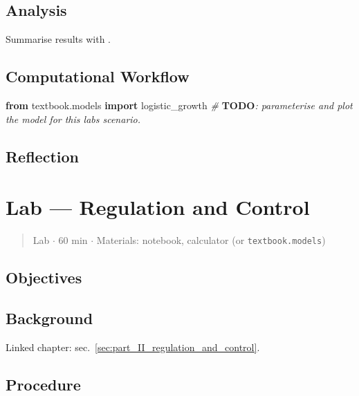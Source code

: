 \documentclass[
]{article}
\newenvironment{Shaded}{}{}
\newcommand{\AlertTok}[1]{\textcolor[rgb]{1.00,0.00,0.00}{\textbf{#1}}}
\newcommand{\CommentTok}[1]{\textcolor[rgb]{0.38,0.63,0.69}{\textit{#1}}}
\newcommand{\ImportTok}[1]{\textcolor[rgb]{0.00,0.50,0.00}{\textbf{#1}}}
\newcommand{\NormalTok}[1]{#1}
\theoremstyle{plain}
\theoremstyle{definition}
\begin{document}
\subsection{Analysis}\label{analysis-7}

Summarise results with .

\subsection{Computational Workflow}\label{computational-workflow-7}

\begin{Shaded}
\begin{Highlighting}[]
\ImportTok{from}\NormalTok{ textbook.models }\ImportTok{import}\NormalTok{ logistic\_growth}
\CommentTok{\# }\AlertTok{TODO}\CommentTok{: parameterise and plot the model for this lab\textquotesingle{}s scenario.}
\end{Highlighting}
\end{Shaded}

\subsection{Reflection}\label{reflection-7}

\newpage

\section{Lab --- Regulation and
Control}\label{sec:lab_part_II_regulation_and_control}

\begin{quote}
Lab \texorpdfstring{\ensuremath{\cdot}}{.} 60 min \texorpdfstring{\ensuremath{\cdot}}{.} Materials: notebook, calculator (or
\texttt{textbook.models})
\end{quote}

\subsection{Objectives}\label{objectives-8}

\subsection{Background}\label{background-8}

Linked chapter: sec.~\ref{sec:part_II_regulation_and_control}.

\subsection{Procedure}\label{procedure-8}
\end{document}
